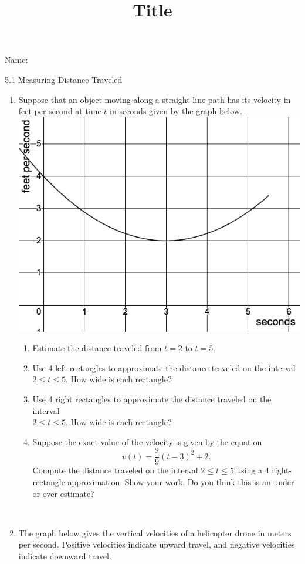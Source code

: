 \documentclass[12pt]{article}
\title{Title}
\begin{document}

 Name:
 \begin{center}\large{5.1 Measuring Distance Traveled}\end{center}

\begin{enumerate}
\item Suppose that an object moving along a straight line path has its velocity in feet per second at time $t$ in seconds given by the graph below.  \\
\includegraphics [scale=.3]{5_1_sum}
	\begin{enumerate}
	\item Estimate the distance traveled from $t=2$ to $t=5$.
	\vfill
	\item Use 4 left rectangles to approximate the distance traveled on the interval\\ $2\le t\le5$. How wide is each rectangle?
		\vfill
	\item Use 4 right rectangles to approximate the distance traveled on the interval\\ $2\le t\le5$. How wide is each rectangle?
		\vfill
	\item Suppose the exact value of the velocity is given by the equation $$\displaystyle v\left(t\right)=\frac{2}{9}\left(t-3\right)^{2}+2.$$
Compute the distance traveled on the interval $2\le t\le5$ using a 4 right-rectangle approximation. Show your work. Do you think this is an under or over estimate?
		\vfill
			\vfill
	\end{enumerate}
\newpage
~
\item The graph below gives the vertical velocities of a helicopter drone in meters per second. Positive velocities indicate upward travel, and negative velocities indicate downward travel. \\

\end{enumerate}
\end{document}
